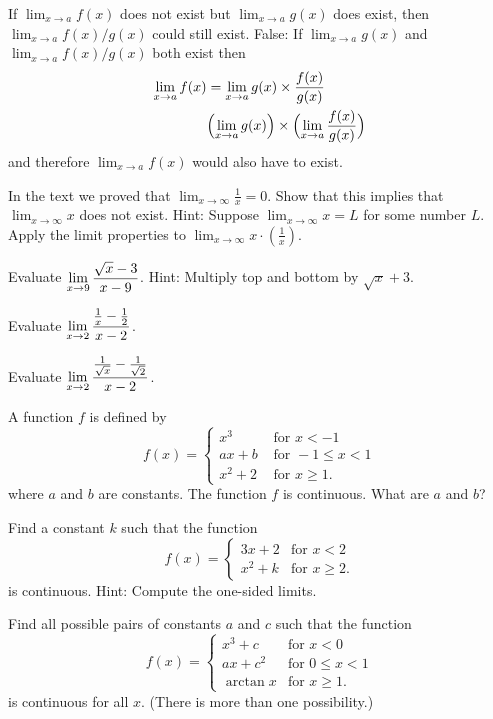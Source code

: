 \subprob If $\lim_{x\to a} f(x)$ does not exist but $\lim_{x\to a} g(x)$ does
exist, then $\lim_{x\to a} f(x)/g(x)$ could still exist.
\answer 
False:  If $\lim_{x\to a} g(x)$ and $\lim_{x\to a} f(x)/g(x)$ both exist then
\begin{align*}
  \lim_{x\to a} f(x) &=
  \lim_{x\to a} g(x) \times \frac{f(x)}{g(x)} \\
  &\Bigl(\lim_{x\to a} g(x)\Bigr) \times \Bigl(\lim_{x\to a} \frac{f(x)}{g(x)}\Bigr) \\
\end{align*}
and therefore $\lim_{x\to a} f(x)$ would also have to exist.
\endanswer

\problem \label{ex:limx-dne} \groupproblem In the text we proved that 
$\lim_{x\to\infty} \frac1x=0$.  Show that this implies that
$\lim_{x\to\infty}x$ does not exist.  Hint: Suppose $\lim_{x\to\infty}x =
L$ for some number $L$.  Apply the limit properties to
$\lim_{x\to\infty}x\cdot (\frac1x)$.
\bigskip

\begin{multicols}{2}\setlength{\parindent}{0pt}
\problem Evaluate $\displaystyle \lim_{x\to 9}\frac{\sqrt x- 3}{x-9}$.  Hint: Multiply top 
and bottom by $\sqrt x+3$.

\problem Evaluate $\displaystyle \lim_{x\to 2}\frac{\frac1x-\frac12}{x-2}$. 

\problem  Evaluate $\displaystyle \lim_{x\to 2}\frac{\frac1{\sqrt{x}}-\frac1{\sqrt2}}{x-2}$. 

\problem  A function $f$ is defined by 
\[
f(x)= \begin{cases}
  x^3 & \text{ for } x<-1\\
  ax+b & \text{ for } -1 \leq x <1\\
  x^2 +2 & \text{ for } x \geq 1.
\end{cases}
\]
where $a$ and $b$ are constants.  The function $f$ is continuous. What
are $a$ and $b$?

\problem Find a constant $k$ such that the function 
\[
f(x)= \begin{cases}
  3x+2 & \text{for }   x <2\\
  x^2 +k & \text{for }x \geq 2.
\end{cases}
\]
is continuous.  Hint: Compute the one-sided limits.

\problem Find all possible pairs of constants $a$ and $c$ such that the function 
\[
f(x)=
\begin{cases}
  x^3+c & \text{for } x<0\\
  ax+c^2 & \text{for } 0 \leq x <1\\
  \arctan x & \text{for }x \geq 1.
\end{cases}
\]
is continuous for all $x$. (There is more than one possibility.)
\end{multicols}


